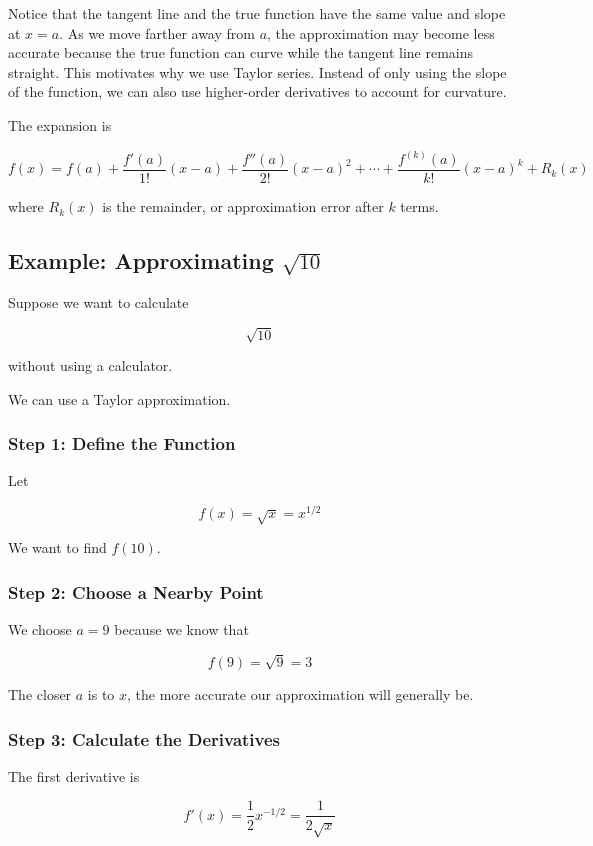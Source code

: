 \documentclass[12pt]{article}
\begin{document}
Notice that the tangent line and the true function
have the same value and slope at $x=a$. As we move farther away from $a$, the approximation
may become less accurate because the true function can curve while the tangent line remains straight. This motivates why we use Taylor series. Instead of only using the slope of the function, we can also use higher-order derivatives to account for curvature.

The expansion is

\[
f(x)
=
f(a)
+
\frac{f'(a)}{1!}(x-a)
+
\frac{f''(a)}{2!}(x-a)^2
+
\cdots
+
\frac{f^{(k)}(a)}{k!}(x-a)^k
+
R_k(x)
\]

where $R_k(x)$ is the remainder, or approximation error after $k$ terms.


\subsection{Example: Approximating $\sqrt{10}$}

Suppose we want to calculate

\[
\sqrt{10}
\]

without using a calculator.

We can use a Taylor approximation.

\subsubsection*{Step 1: Define the Function}

Let

\[
f(x)=\sqrt{x}=x^{1/2}
\]

We want to find $f(10)$.

\subsubsection*{Step 2: Choose a Nearby Point}

We choose $a=9$ because we know that

\[
f(9)=\sqrt{9}=3
\]

The closer $a$ is to $x$, the more accurate
our approximation will generally be.

\subsubsection*{Step 3: Calculate the Derivatives}

The first derivative is

\[
f'(x)=\frac{1}{2}x^{-1/2}
=\frac{1}{2\sqrt{x}}
\]
\end{document}
